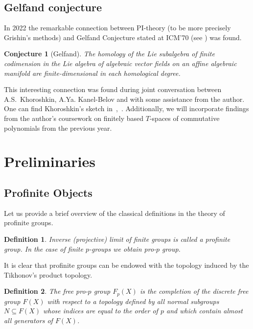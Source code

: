 \documentclass[12pt,a4paper]{article}
\newtheorem*{conjecture*}{Conjecture}
\newtheorem{definition}{Definition}[subsection]
\begin{document}
    \subsection{Gelfand conjecture}
    In 2022 the remarkable connection between PI-theory (to be more precisely Grishin's methods) and Gelfand Conjecture stated at ICM’70 (see \cite{Gelfand}) was found.
    \vskip 0.1in\noindent
    \begin{conjecture*}[Gelfand]
        The homology of the Lie subalgebra of finite codimension in the Lie algebra of algebraic vector fields on an affine algebraic manifold are finite-dimensional in each
        homological degree.
    \end{conjecture*}
    \vskip 0.1in\noindent
    This interesting connection was found during joint conversation between A.S.\ Khoroshkin, A.Ya. Kanel-Belov and with some assistance from the author.
    One can find Khoroshkin's sketch in~\cite{Feigin-Kanel-Khoroshkin},~\cite{Centrone-Kanel-Khoroshkin-Vorobiov}.
    Additionally, we will incorporate findings from the author's coursework on finitely based $T$-spaces of commutative polynomials from the previous year.


    \section{Preliminaries}

    \subsection{Profinite Objects}
    Let us provide a brief overview of the classical definitions in the theory of profinite groups.
    \vskip 0.1in\noindent
    \begin{definition}
        Inverse (projective) limit of finite groups is called a profinite group.
        In the case of finite $p$-groups we obtain pro-$p$ group.
    \end{definition}
    \vskip 0.1in\noindent
    It is clear that profinite groups can be endowed with the topology induced by the Tikhonov's product topology.

    \vskip 0.1in\noindent
    \begin{definition}
        The free pro-$p$ group $F_p(X)$ is the completion of the discrete free group $F(X)$ with respect to a topology defined by all normal subgroups $N \subseteq F(X)$ whose indices are equal to the order of $p$ and which contain almost all generators of $F(X)$.
    \end{definition}
    \vskip 0.1in\noindent
\end{document}
